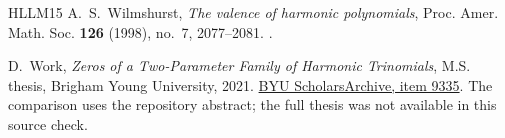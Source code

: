 \documentclass[UTF8,11pt]{ctexart}
\theoremstyle{definition}
\numberwithin{equation}{section}
\begin{document}
\begin{thebibliography}{HLLM15}
A.~S.~Wilmshurst,
\emph{The valence of harmonic polynomials},
Proc. Amer. Math. Soc. \textbf{126} (1998), no.~7, 2077--2081.
.

D.~Work,
\emph{Zeros of a Two-Parameter Family of Harmonic Trinomials},
M.S. thesis, Brigham Young University, 2021.
\href{https://scholarsarchive.byu.edu/etd/9335/}{BYU ScholarsArchive, item 9335}.
The comparison uses the repository abstract; the full thesis was
not available in this source check.

\end{thebibliography}
\end{document}
